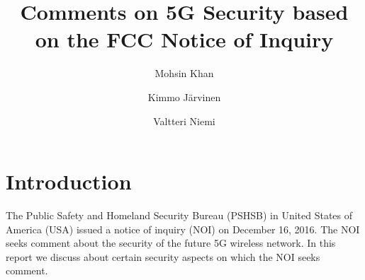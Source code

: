 \documentclass[lnicst,sechang,a4paper]{svmultln}
\begin{document}
\mainmatter  %

\title{Comments on 5G Security based on the FCC Notice of Inquiry}


%
%
\author{Mohsin Khan%
\and Kimmo J\"arvinen
\and Valtteri Niemi}  %


%
%

\maketitle





\section{Introduction}
\label{intro} 
The Public Safety and Homeland Security Bureau (PSHSB) in United States of America (USA) issued a notice of inquiry (NOI) on December 16, 2016. The NOI seeks comment about the security of the future 5G wireless network. In this report we discuss about certain security aspects on which the NOI seeks comment.
\end{document}

